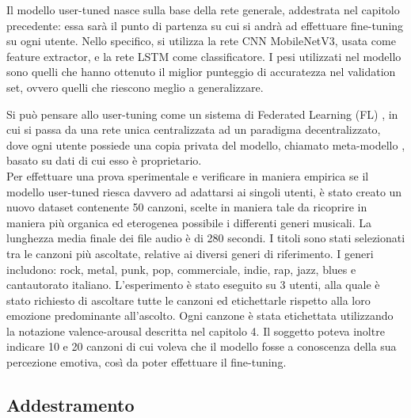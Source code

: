 \documentclass[11pt]{report}
\begin{document}
Il modello user-tuned nasce sulla base della rete generale, addestrata nel capitolo precedente: essa sarà il punto di partenza su cui si andrà ad effettuare fine-tuning su ogni utente. Nello specifico, si utilizza la rete CNN MobileNetV3, usata come feature extractor, e la rete LSTM come classificatore. I pesi utilizzati nel modello sono quelli che hanno ottenuto il miglior punteggio di accuratezza nel validation set, ovvero quelli che riescono meglio a generalizzare.

Si può pensare allo user-tuning come un sistema di Federated Learning (FL) \cite{li2020federated}, in cui si passa da una rete unica centralizzata ad un paradigma decentralizzato, dove ogni utente possiede una copia privata del modello, chiamato meta-modello \cite{vanschoren2019meta}, basato su dati di cui esso è proprietario. \\

Per effettuare una prova sperimentale e verificare in maniera empirica se il modello user-tuned riesca davvero ad adattarsi ai singoli utenti, è stato creato un nuovo dataset contenente 50 canzoni, scelte in maniera tale da ricoprire in maniera più organica ed eterogenea possibile i differenti generi musicali. La lunghezza media finale dei file audio è di 280 secondi. I titoli sono stati selezionati tra le canzoni più ascoltate, relative ai diversi generi di riferimento. I generi includono: rock, metal, punk, pop, commerciale, indie, rap, jazz, blues e cantautorato italiano. L'esperimento è stato eseguito su 3 utenti, alla quale è stato richiesto di ascoltare tutte le canzoni ed etichettarle rispetto alla loro emozione predominante all'ascolto. Ogni canzone è stata etichettata utilizzando la notazione valence-arousal descritta nel capitolo 4. Il soggetto poteva inoltre indicare 10 e 20 canzoni di cui voleva che il modello fosse a conoscenza della sua percezione emotiva, così da poter effettuare il fine-tuning.

\subsection{Addestramento}
\end{document}

